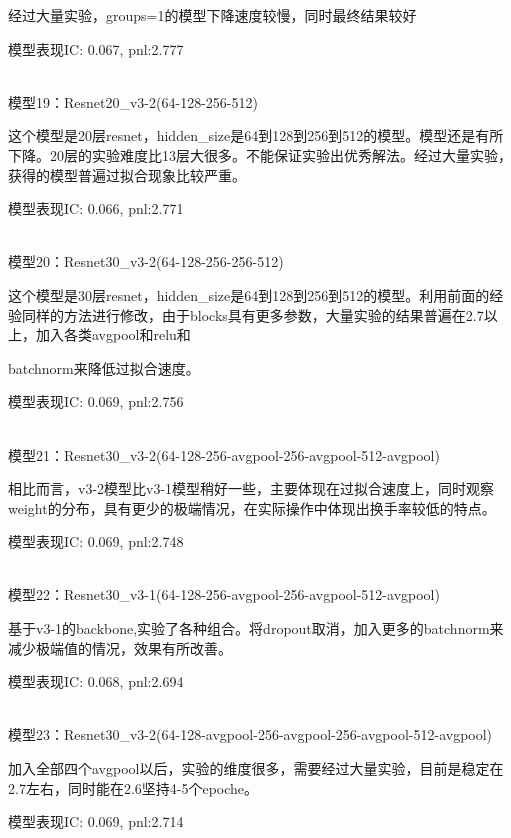 \documentclass[11pt]{ctexart}
\begin{document}
经过大量实验，groups=1的模型下降速度较慢，同时最终结果较好

模型表现{\kaishu \small IC: 0.067, pnl:2.777}

~\\
模型19：Resnet20\_v3-2(64-128-256-512)

这个模型是20层resnet，hidden\_size是64到128到256到512的模型。模型还是有所下降。20层的实验难度比13层大很多。不能保证实验出优秀解法。经过大量实验，获得的模型普遍过拟合现象比较严重。

模型表现{\kaishu \small IC: 0.066, pnl:2.771}

~\\
模型20：Resnet30\_v3-2(64-128-256-256-512)

这个模型是30层resnet，hidden\_size是64到128到256到512的模型。利用前面的经验同样的方法进行修改，由于blocks具有更多参数，大量实验的结果普遍在2.7以上，加入各类avgpool和relu和 \par batchnorm来降低过拟合速度。


模型表现{\kaishu \small IC: 0.069, pnl:2.756}

~\\
模型21：Resnet30\_v3-2(64-128-256-avgpool-256-avgpool-512-avgpool)

相比而言，v3-2模型比v3-1模型稍好一些，主要体现在过拟合速度上，同时观察weight的分布，具有更少的极端情况，在实际操作中体现出换手率较低的特点。

模型表现{\kaishu \small IC: 0.069, pnl:2.748}

~\\
模型22：Resnet30\_v3-1(64-128-256-avgpool-256-avgpool-512-avgpool)

基于v3-1的backbone,实验了各种组合。将dropout取消，加入更多的batchnorm来减少极端值的情况，效果有所改善。

模型表现{\kaishu \small IC: 0.068, pnl:2.694}

~\\
模型23：Resnet30\_v3-2(64-128-avgpool-256-avgpool-256-avgpool-512-avgpool)

加入全部四个avgpool以后，实验的维度很多，需要经过大量实验，目前是稳定在2.7左右，同时能在2.6坚持4-5个epoche。

模型表现{\kaishu \small IC: 0.069, pnl:2.714}
\end{document}
